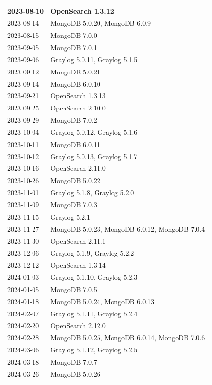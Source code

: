 \documentclass[../main.tex]{subfiles}
\begin{document}
\begin{longtable}{|l|l|}
2023-08-10 & OpenSearch 1.3.12 \\ \hline
2023-08-14 & MongoDB 5.0.20, MongoDB 6.0.9 \\ \hline
2023-08-15 & MongoDB 7.0.0 \\ \hline
2023-09-05 & MongoDB 7.0.1 \\ \hline
2023-09-06 & Graylog 5.0.11, Graylog 5.1.5 \\ \hline
2023-09-12 & MongoDB 5.0.21 \\ \hline
2023-09-14 & MongoDB 6.0.10 \\ \hline
2023-09-21 & OpenSearch 1.3.13 \\ \hline
2023-09-25 & OpenSearch 2.10.0 \\ \hline
2023-09-29 & MongoDB 7.0.2 \\ \hline
2023-10-04 & Graylog 5.0.12, Graylog 5.1.6 \\ \hline
2023-10-11 & MongoDB 6.0.11 \\ \hline
2023-10-12 & Graylog 5.0.13, Graylog 5.1.7 \\ \hline
2023-10-16 & OpenSearch 2.11.0 \\ \hline
2023-10-26 & MongoDB 5.0.22 \\ \hline
2023-11-01 & Graylog 5.1.8, Graylog 5.2.0 \\ \hline
2023-11-09 & MongoDB 7.0.3 \\ \hline
2023-11-15 & Graylog 5.2.1 \\ \hline
2023-11-27 & MongoDB 5.0.23, MongoDB 6.0.12, MongoDB 7.0.4 \\ \hline
2023-11-30 & OpenSearch 2.11.1 \\ \hline
2023-12-06 & Graylog 5.1.9, Graylog 5.2.2 \\ \hline
2023-12-12 & OpenSearch 1.3.14 \\ \hline
2024-01-03 & Graylog 5.1.10, Graylog 5.2.3 \\ \hline
2024-01-05 & MongoDB 7.0.5 \\ \hline
2024-01-18 & MongoDB 5.0.24, MongoDB 6.0.13 \\ \hline
2024-02-07 & Graylog 5.1.11, Graylog 5.2.4 \\ \hline
2024-02-20 & OpenSearch 2.12.0 \\ \hline
2024-02-28 & MongoDB 5.0.25, MongoDB 6.0.14, MongoDB 7.0.6\\ \hline
2024-03-06 & Graylog 5.1.12, Graylog 5.2.5 \\ \hline
2024-03-18 & MongoDB 7.0.7 \\ \hline
2024-03-26 & MongoDB 5.0.26 \\ \hline

\end{longtable}
\end{document}
